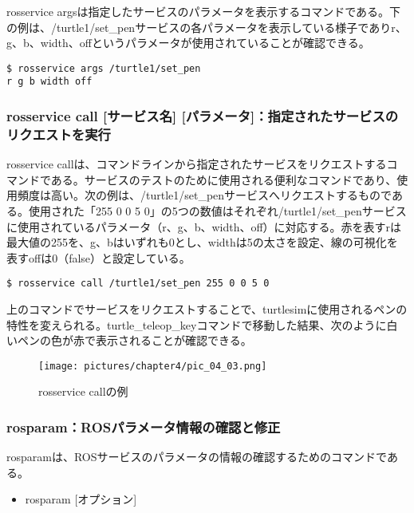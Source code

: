rosservice argsは指定したサービスのパラメータを表示するコマンドである。下の例は、/turtle1/set\_penサービスの各パラメータを表示している様子でありr、g、b、width、offというパラメータが使用されていることが確認できる。

\begin{lstlisting}[language=ROS]
$ rosservice args /turtle1/set_pen
r g b width off
\end{lstlisting}

\subsubsection{rosservice call [サービス名] [パラメータ]：指定されたサービスのリクエストを実行}

rosservice callは、コマンドラインから指定されたサービスをリクエストするコマンドである。サービスのテストのために使用される便利なコマンドであり、使用頻度は高い。次の例は、/turtle1/set\_penサービスへリクエストするものである。使用された「255 0 0 5 0」の5つの数値はそれぞれ/turtle1/set\_penサービスに使用されているパラメータ（r、g、b、width、off）に対応する。赤を表すrは最大値の255を、g、bはいずれも0とし、widthは5の太さを設定、線の可視化を表すoffは0（false）と設定している。

\begin{lstlisting}[language=ROS]
$ rosservice call /turtle1/set_pen 255 0 0 5 0
\end{lstlisting}

上のコマンドでサービスをリクエストすることで、turtlesimに使用されるペンの特性を変えられる。turtle\_teleop\_keyコマンドで移動した結果、次のように白いペンの色が赤で表示されることが確認できる。

\begin{figure}[h]
  \centering
  \texttt{[image: pictures/chapter4/pic\_04\_03.png]}
  \caption{rosservice callの例}
\end{figure}

\subsubsection{rosparam：ROSパラメータ情報の確認と修正}

rosparamは、ROSサービスのパラメータの情報の確認するためのコマンドである。

\vspace{\baselineskip}
\begin{itemize}
\item rosparam [オプション]
\end{itemize}
\vspace{\baselineskip}

